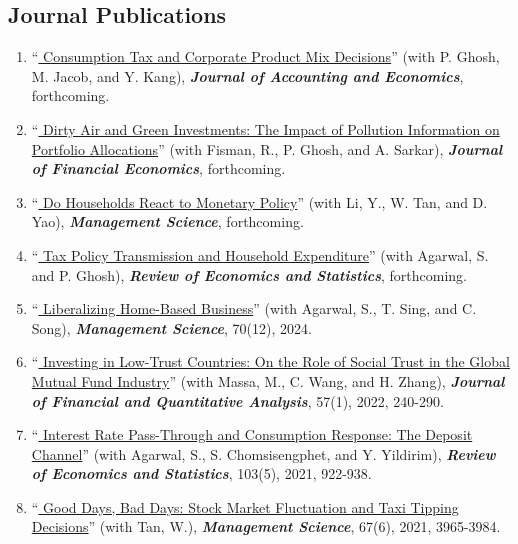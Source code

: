 \documentclass[margin,line]{res}
\begin{document}
\begin{resume}
\section{\sc Journal Publications}
\begin{enumerate}
\item ``\href{https://www.sciencedirect.com/science/article/pii/S0165410126000418}{\color{black} Consumption Tax and Corporate Product Mix Decisions}'' (with P. Ghosh, M. Jacob, and Y. Kang), \textbf{\emph{Journal of Accounting and Economics}}, forthcoming.
\vspace*{0.2cm} 	

\item ``\href{https://www.nber.org/papers/w31813}{\color{black} Dirty Air and Green Investments: The Impact of Pollution Information on Portfolio Allocations}'' (with Fisman, R., P. Ghosh, and A. Sarkar), \textbf{\emph{Journal of Financial Economics}}, forthcoming.
\vspace*{0.2cm} 	

\item ``\href{https://doi.org/10.1287/mnsc.2024.04649}{\color{black} Do Households React to Monetary Policy}'' (with Li, Y., W. Tan, and D. Yao), \textbf{\emph{Management Science}}, forthcoming.
	\vspace*{0.2cm}
\item ``\href{https://doi.org/10.1162/rest_a_01584}{\color{black} Tax Policy Transmission and Household Expenditure}'' (with Agarwal, S. and P. Ghosh), \textbf{\emph{Review of Economics and Statistics}}, forthcoming.
	\vspace*{0.2cm}
\item ``\href{https://doi.org/10.1287/mnsc.2021.04232}{\color{black} Liberalizing Home-Based Business}'' (with Agarwal, S., T. Sing, and C. Song), \textbf{\emph{Management Science}}, 70(12), 2024.
	\vspace*{0.2cm}
\item ``\href{https://jfqa.org/2020/04/28/investing-in-low-trust-countries-on-the-role-of-social-trust-in-the-global-mutual-fund-industry/}{\color{black} Investing in Low-Trust Countries: On the Role of Social Trust in the Global Mutual Fund Industry}'' (with Massa, M., C. Wang, and H. Zhang), \textbf{\emph{Journal of Financial and Quantitative Analysis}}, 57(1), 2022, 240-290.
	\vspace*{0.2cm}
\item ``\href{https://www.mitpressjournals.org/doi/abs/10.1162/rest_a_00941?mobileUi=0}{\color{black} Interest Rate Pass-Through and Consumption Response: The Deposit Channel}'' (with Agarwal, S., S. Chomsisengphet, and Y. Yildirim), \textbf{\emph{Review of Economics and Statistics}}, 103(5), 2021, 922-938.
\vspace*{0.2cm}	
\item %
 ``\href{https://pubsonline.informs.org/doi/10.1287/mnsc.2019.3557}{\color{black} Good Days, Bad Days: Stock Market Fluctuation and Taxi Tipping Decisions}'' (with Tan, W.), \textbf{\emph{Management Science}}, 67(6), 2021, 3965-3984.
\vspace*{0.2cm}



\end{enumerate}
\end{resume}
\end{document}
